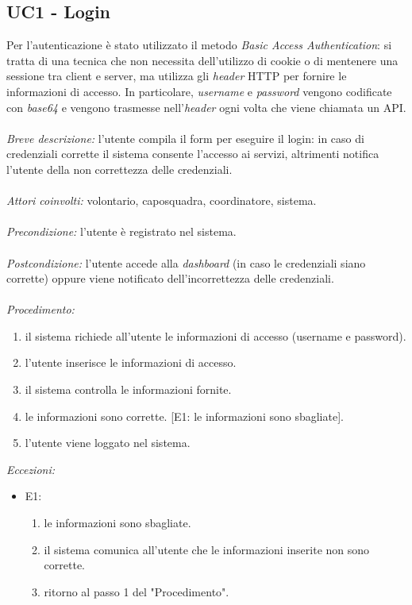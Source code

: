 \subsection{UC1 - Login}
Per l'autenticazione è stato utilizzato il metodo \textit{Basic Access Authentication}: si tratta di una tecnica che non necessita dell'utilizzo di cookie o di mentenere una sessione tra client e server, ma utilizza gli \textit{header} HTTP per fornire le informazioni di accesso. In particolare, \textit{username} e \textit{password} vengono codificate con \textit{base64} e vengono trasmesse nell'\textit{header} ogni volta che viene chiamata un API. 
\\
\\
\textit{Breve descrizione:} l'utente compila il form per eseguire il login: in caso di credenziali corrette il sistema consente l'accesso ai servizi, altrimenti notifica l'utente della non correttezza delle credenziali. 
\\
\\
\textit{Attori coinvolti:} volontario, caposquadra, coordinatore, sistema.
\\
\\
\textit{Precondizione:} l'utente è registrato nel sistema.
\\
\\
\textit{Postcondizione:} l'utente accede alla \textit{dashboard} (in caso le credenziali siano corrette) oppure viene notificato dell'incorrettezza delle credenziali.
\\
\\
\textit{Procedimento:}
\begin{enumerate}
	\item il sistema richiede all'utente le informazioni di accesso (username e password).
	\item l'utente inserisce le informazioni di accesso.
	\item il sistema controlla le informazioni fornite.
	\item le informazioni sono corrette. [E1: le informazioni sono sbagliate].
	\item l'utente viene loggato nel sistema.
\end{enumerate}


\textit{Eccezioni:}
\begin{itemize}
	\item E1:
	\begin{enumerate}
		\item le informazioni sono sbagliate.
		\item il sistema comunica all'utente che le informazioni inserite non sono corrette.
		\item ritorno al passo 1 del "Procedimento".
	\end{enumerate}
\end{itemize}



